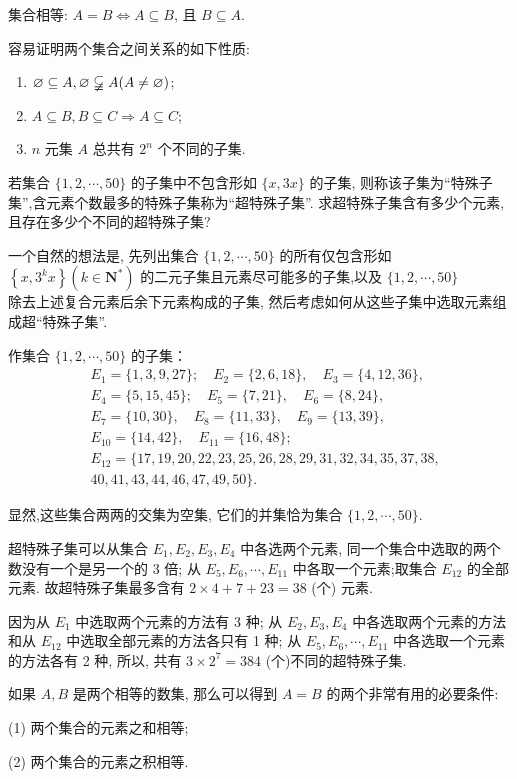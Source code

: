 集合相等: $A=B \Leftrightarrow A \subseteq B$, 且 $B \subseteq A$.

容易证明两个集合之间关系的如下性质:

\begin{enumerate}
	\item $\varnothing \subseteq A, \varnothing \varsubsetneqq A(A \neq \varnothing)$;
	\item $A \subseteq B, B \subseteq C \Rightarrow A \subseteq C$;
	\item $n$ 元集 $A$ 总共有 $2^{n}$ 个不同的子集.
\end{enumerate}
\begin{example}
	若集合 $\{1,2, \cdots, 50\}$ 的子集中不包含形如 $\{x, 3 x\}$ 的子集, 则称该子集为“特殊子集”,含元素个数最多的特殊子集称为“超特殊子集”. 求超特殊子集含有多少个元素,且存在多少个不同的超特殊子集?
\end{example}

\begin{analysis}
	一个自然的想法是, 先列出集合 $\{1,2, \cdots, 50\}$ 的所有仅包含形如 $\left\{x, 3^{k} x\right\}\left(k \in \mathbf{N}^{*}\right)$ 的二元子集且元素尽可能多的子集,以及 $\{1,2, \cdots, 50\}$\\
	除去上述复合元素后余下元素构成的子集, 然后考虑如何从这些子集中选取元素组成超“特殊子集”.
\end{analysis}
\begin{solution}
	作集合 $\{1,2, \cdots, 50\}$ 的子集：
	$$
		\begin{aligned}
			 & E_{1}=\{1,3,9,27\} ; \quad E_{2}=\{2,6,18\}, \quad E_{3}=\{4,12,36\}, \\
			 & E_{4}=\{5,15,45\} ; \quad E_{5}=\{7,21\}, \quad E_{6}=\{8,24\},       \\
			 & E_{7}=\{10,30\}, \quad E_{8}=\{11,33\}, \quad E_{9}=\{13,39\},        \\
			 & E_{10}=\{14,42\}, \quad E_{11}=\{16,48\} ;                            \\
			 & E_{12}=\{17,19,20,22,23,25,26,28,29,31,32,34,35,37,38,                \\
			 & 40,41,43,44,46,47,49,50\} .
		\end{aligned}
	$$

	显然,这些集合两两的交集为空集, 它们的并集恰为集合 $\{1,2, \cdots, 50\}$.

	超特殊子集可以从集合 $E_{1} ,  E_{2} ,  E_{3} ,  E_{4}$ 中各选两个元素, 同一个集合中选取的两个数没有一个是另一个的 3 倍; 从 $E_{5}, E_{6}, \cdots, E_{11}$ 中各取一个元素;取集合 $E_{12}$ 的全部元素. 故超特殊子集最多含有 $2 \times 4+7+23=38$ (个) 元素.

	因为从 $E_{1}$ 中选取两个元素的方法有 3 种; 从 $E_{2} ,  E_{3} ,  E_{4}$ 中各选取两个元素的方法和从 $E_{12}$ 中选取全部元素的方法各只有 1 种; 从 $E_{5}, E_{6}, \cdots, E_{11}$ 中各选取一个元素的方法各有 2 种, 所以, 共有 $3 \times 2^{7}=384$ (个)不同的超特殊子集.

	如果 $A ,  B$ 是两个相等的数集, 那么可以得到 $A=B$ 的两个非常有用的必要条件:

	(1) 两个集合的元素之和相等;

	(2) 两个集合的元素之积相等.
\end{solution}


